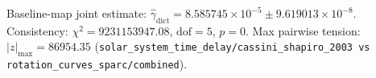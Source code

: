 Baseline-map joint estimate: $\widehat\gamma_{\mathrm{dict}}=8.585745\times 10^{-5} \pm 9.619013\times 10^{-8}$. Consistency: $\chi^2=9231153947.08$, $\mathrm{dof}=5$, $p=0$. Max pairwise tension: $|z|_{\max}=86954.35$ (\texttt{solar\_system\_time\_delay/cassini\_shapiro\_2003 vs rotation\_curves\_sparc/combined}).